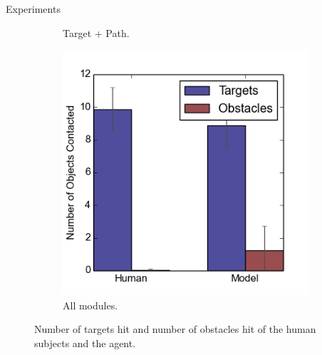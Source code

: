 \documentclass[final]{beamer}
\begin{document}
\begin{frame}{}
\begin{textblock}{37}
\begin{block}{Experiments}
\begin{figure}[h]
\begin{subfigure}[b]{0.24\textwidth}
\caption{Target + Path. }
\end{subfigure}
\begin{subfigure}[b]{0.24\textwidth}
\includegraphics[width=\textwidth]{contact4.png}
\caption{All modules. }
\end{subfigure}
\caption{Number of targets hit and number of obstacles hit of the human subjects 
and the agent.}
\label{fig:stats}
\end{figure}


\end{block}
\end{textblock}
\end{frame}
\end{document}
